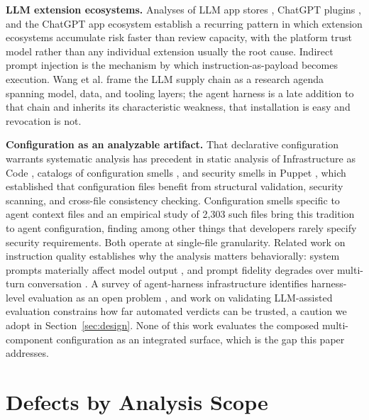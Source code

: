 \documentclass[conference]{IEEEtran}
\begin{document}
\textbf{LLM extension ecosystems.} Analyses of LLM app stores
\cite{hou2025appstores}, ChatGPT plugins \cite{iqbal2024plugins}, and the
ChatGPT app ecosystem \cite{yan2024ecosystem} establish a recurring pattern in
which extension ecosystems accumulate risk faster than review capacity, with the
platform trust model rather than any individual extension usually the root
cause. Indirect prompt injection \cite{greshake2023injection} is the mechanism
by which instruction-as-payload becomes execution. Wang et al.
\cite{wang2025supplychain} frame the LLM supply chain as a research agenda
spanning model, data, and tooling layers; the agent harness is a late addition
to that chain and inherits its characteristic weakness, that installation is
easy and revocation is not.

\textbf{Configuration as an analyzable artifact.} That declarative configuration
warrants systematic analysis has precedent in static analysis of Infrastructure
as Code \cite{chiari2022iac}, catalogs of configuration smells
\cite{sharma2016smell}, and security smells in Puppet \cite{rahman2019sins},
which established that configuration files benefit from structural validation,
security scanning, and cross-file consistency checking. Configuration smells
specific to agent context files \cite{gloaguen2026smells} and an empirical study
of 2{,}303 such files \cite{chatlatanagulchai2025readmes} bring this tradition to
agent configuration, finding among other things that developers rarely specify
security requirements. Both operate at single-file granularity. Related work on
instruction quality establishes why the analysis matters behaviorally: system
prompts materially affect model output \cite{khojah2025prompt}, and prompt
fidelity degrades over multi-turn conversation \cite{li2024instability}. A survey
of agent-harness infrastructure identifies harness-level evaluation as an open
problem \cite{ning2026harness}, and work on validating LLM-assisted evaluation
\cite{shankar2024validators} constrains how far automated verdicts can be
trusted, a caution we adopt in Section~\ref{sec:design}. None of this work
evaluates the composed multi-component configuration as an integrated surface,
which is the gap this paper addresses.

\section{Defects by Analysis Scope}
\label{sec:taxonomy}
\end{document}
